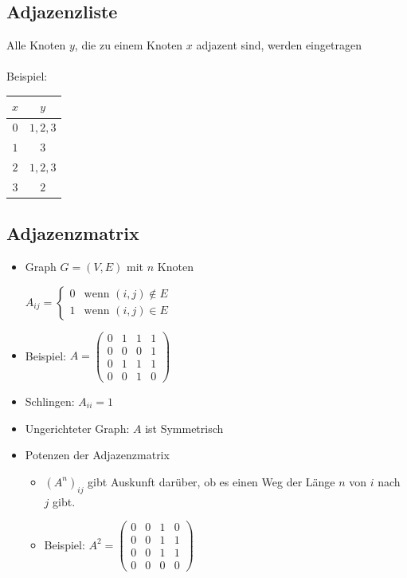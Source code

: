 \documentclass[a4paper,portrait]{scrartcl}
\begin{document}
\subsection{Adjazenzliste}
Alle Knoten $y$, die zu einem Knoten $x$ adjazent sind, werden eingetragen\\ \\
Beispiel: 
\begin{tabular}{c|c}
  $x$&$y$ \\ \hline \hline
  $0$&$1,2,3$\\ \hline
  $1$&$3$\\ \hline
  $2$&$1,2,3$\\ \hline
  $3$&$2$
\end{tabular}
\subsection{Adjazenzmatrix}
\begin{itemize}
\item Graph $ G=(V,E) $ mit $n$ Knoten

$A_{ij} = \begin{cases}
0&\text{wenn } (i,j) \notin E\\
1&\text{wenn } (i,j) \in E
\end{cases}$

\item Beispiel: 
$ A =
\begin{pmatrix}
0 & 1 & 1 & 1 \\
0 & 0 & 0 & 1 \\
0 & 1 & 1 & 1 \\
0 & 0 & 1 & 0
\end{pmatrix}
$  
\item Schlingen: $A_{ii} = 1$
\item Ungerichteter Graph: $A$ ist Symmetrisch
\item Potenzen der Adjazenzmatrix
\begin{itemize}
  \item $(A^{n})_{ij}$ gibt Auskunft darüber, ob es einen Weg der Länge $n$ von $i$ nach $j$ gibt.
  \item Beispiel: 
  $ A^{2} =
  \begin{pmatrix}
  0 & 0 & 1 & 0 \\
  0 & 0 & 1 & 1 \\
  0 & 0 & 1 & 1 \\
  0 & 0 & 0 & 0
  \end{pmatrix}
  $  
\end{itemize}
\end{itemize}
\end{document}
